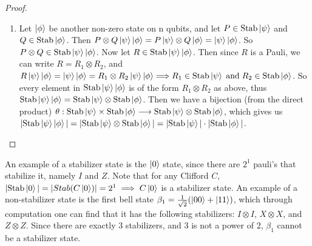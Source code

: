 \documentclass[12pt]{dalthesis}
\begin{document}
\begin{proof}
\begin{enumerate}
\item Let $\ket{\phi}$ be another non-zero state on n qubits, and let $P \in \text{Stab}\ket{\psi}$ and $Q \in \text{Stab}\ket{\phi}$. Then $P \otimes Q \ket{\psi}\ket{\phi} = P\ket{\psi} \otimes Q\ket{\phi} = \ket{\psi}\ket{\phi}$. So $P \otimes Q \in \text{Stab}\ket{\psi}\ket{\phi}$. Now let $R \in \text{Stab}\ket{\psi}\ket{\phi}$. Then since $R$ is a Pauli, we can write $R = R_1 \otimes R_2$, and $R\ket{\psi}\ket{\phi} = \ket{\psi}\ket{\phi} = R_1 \otimes R_2 \ket{\psi}\ket{\phi} \Longrightarrow R_1 \in \text{Stab}\ket{\psi} \hspace{1mm} \text{and} \hspace{1mm} R_2 \in \text{Stab}\ket{\phi}$. So every element in $\text{Stab}\ket{\psi}\ket{\phi}$ is of the form $R_1 \otimes R_2$ as above, thus $\text{Stab}\ket{\psi}\ket{\phi} = \text{Stab}\ket{\psi} \otimes \text{Stab}\ket{\phi}$. Then we have a bijection (from the direct product) $\theta:\text{Stab}\ket{\psi} \times \text{Stab}\ket{\phi} \longrightarrow  \text{Stab}\ket{\psi} \otimes \text{Stab}\ket{\phi}$, which gives us $|\text{Stab}\ket{\psi}\ket{\phi}| = |\text{Stab}\ket{\psi} \otimes \text{Stab}\ket{\phi}| = |\text{Stab}\ket{\psi}| \cdot |\text{Stab}\ket{\phi}|$.
\end{enumerate}
\end{proof}



An example of a stabilizer state is the $\ket{0}$ state, since there are $2^1$ pauli's that stabilize it, namely $I$ and $Z$. Note that for any Clifford $C$, $|\text{Stab}\ket{0}| = |Stab(C\ket{0})| = 2^1 \implies C\ket{0}$ is a stabilizer state.
An example of a non-stabilizer state is the first bell state $\beta_1 = \frac{1}{\sqrt{2}}(\ket{00} + \ket{11})$, which through computation one can find that it has the following stabilizers: $I \otimes I$, $X \otimes X$, and $Z \otimes Z$. Since there are exactly $3$ stabilizers, and $3$ is not a power of $2$, $\beta_1$ cannot be a stabilizer state.
\end{document}
